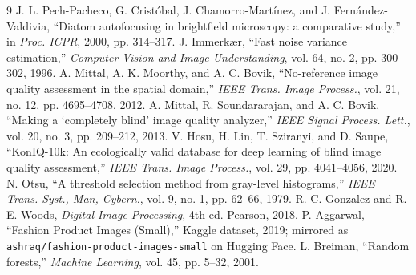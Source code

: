 \documentclass[conference]{IEEEtran}
\begin{document}
\begin{thebibliography}{9}
 J. L. Pech-Pacheco, G. Cristóbal, J. Chamorro-Martínez, and J. Fernández-Valdivia, ``Diatom autofocusing in brightfield microscopy: a comparative study,'' in \emph{Proc. ICPR}, 2000, pp. 314--317.
 J. Immerkær, ``Fast noise variance estimation,'' \emph{Computer Vision and Image Understanding}, vol. 64, no. 2, pp. 300--302, 1996.
 A. Mittal, A. K. Moorthy, and A. C. Bovik, ``No-reference image quality assessment in the spatial domain,'' \emph{IEEE Trans. Image Process.}, vol. 21, no. 12, pp. 4695--4708, 2012.
 A. Mittal, R. Soundararajan, and A. C. Bovik, ``Making a `completely blind' image quality analyzer,'' \emph{IEEE Signal Process. Lett.}, vol. 20, no. 3, pp. 209--212, 2013.
 V. Hosu, H. Lin, T. Sziranyi, and D. Saupe, ``KonIQ-10k: An ecologically valid database for deep learning of blind image quality assessment,'' \emph{IEEE Trans. Image Process.}, vol. 29, pp. 4041--4056, 2020.
 N. Otsu, ``A threshold selection method from gray-level histograms,'' \emph{IEEE Trans. Syst., Man, Cybern.}, vol. 9, no. 1, pp. 62--66, 1979.
 R. C. Gonzalez and R. E. Woods, \emph{Digital Image Processing}, 4th ed. Pearson, 2018.
 P. Aggarwal, ``Fashion Product Images (Small),'' Kaggle dataset, 2019; mirrored as \texttt{ashraq/fashion-product-images-small} on Hugging Face.
 L. Breiman, ``Random forests,'' \emph{Machine Learning}, vol. 45, pp. 5--32, 2001.
\end{thebibliography}
\end{document}
